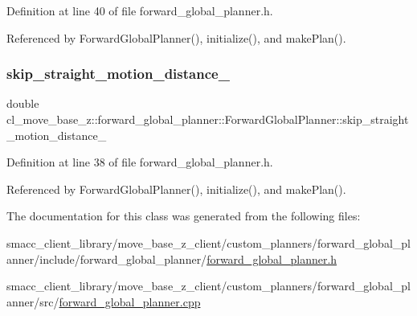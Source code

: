 Definition at line 40 of file forward\+\_\+global\+\_\+planner.\+h.



Referenced by Forward\+Global\+Planner(), initialize(), and make\+Plan().

\mbox{\label{classcl__move__base__z_1_1forward__global__planner_1_1ForwardGlobalPlanner_abafd101fa62caf2d74f118a0b4bb948c}} 
\subsubsection{\texorpdfstring{skip\+\_\+straight\+\_\+motion\+\_\+distance\+\_\+}{skip\_straight\_motion\_distance\_}}
{\footnotesize\ttfamily double cl\+\_\+move\+\_\+base\+\_\+z\+::forward\+\_\+global\+\_\+planner\+::\+Forward\+Global\+Planner\+::skip\+\_\+straight\+\_\+motion\+\_\+distance\+\_\+\hspace{0.3cm}{\ttfamily [private]}}



Definition at line 38 of file forward\+\_\+global\+\_\+planner.\+h.



Referenced by Forward\+Global\+Planner(), initialize(), and make\+Plan().



The documentation for this class was generated from the following files\+:\begin{DoxyCompactItemize}
\item 
smacc\+\_\+client\+\_\+library/move\+\_\+base\+\_\+z\+\_\+client/custom\+\_\+planners/forward\+\_\+global\+\_\+planner/include/forward\+\_\+global\+\_\+planner/\hyperlink{forward__global__planner_8h}{forward\+\_\+global\+\_\+planner.\+h}\item 
smacc\+\_\+client\+\_\+library/move\+\_\+base\+\_\+z\+\_\+client/custom\+\_\+planners/forward\+\_\+global\+\_\+planner/src/\hyperlink{forward__global__planner_8cpp}{forward\+\_\+global\+\_\+planner.\+cpp}\end{DoxyCompactItemize}
